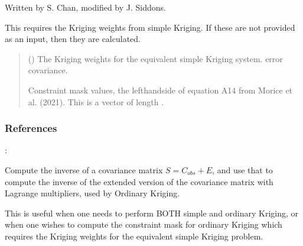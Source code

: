 \documentclass[letterpaper,10pt,english]{sphinxmanual}
\begin{document}
\begin{fulllineitems}
\begin{fulllineitems}
\sphinxAtStartPar
Written by S. Chan, modified by J. Siddons.

\sphinxAtStartPar
This requires the Kriging weights from simple Kriging. If these are
not provided as an input, then they are calculated.
\begin{quote}\begin{description}
\sphinxAtStartPar
{} () \textendash{} The Kriging weights for the equivalent simple Kriging system.
error covariance.

\sphinxAtStartPar
{} \textendash{} Constraint mask values, the left\sphinxhyphen{}hand\sphinxhyphen{}side of equation A14 from
Morice et al. (2021). This is a vector of length .

\sphinxAtStartPar
{}

\end{description}\end{quote}
\subsubsection*{References}

\sphinxAtStartPar
{}: 

\end{fulllineitems}


\begin{fulllineitems}
\label{\detokenize{kriging:glomar_gridding.kriging.OrdinaryKriging.extended_inverse}}
\pysigstartsignatures
\pysiglinewithargsret
{}
{}
{}
\pysigstopsignatures
\sphinxAtStartPar
Compute the inverse of a covariance matrix \(S = C_{obs} + E\), and
use that to compute the inverse of the extended version of the
covariance matrix with Lagrange multipliers, used by Ordinary Kriging.

\sphinxAtStartPar
This is useful when one needs to perform BOTH simple and ordinary
Kriging, or when one wishes to compute the constraint mask for
ordinary Kriging which requires the Kriging weights for the equivalent
simple Kriging problem.


\end{fulllineitems}
\end{fulllineitems}
\end{document}
